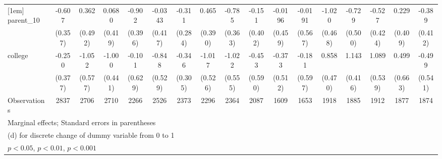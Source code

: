 {\begin{tabular}{l*{16}{c}}
[1em]
parent\_10           &      -0.607         &       0.362         &      0.0680         &      -0.902\sym{*}  &     -0.0343         &      -0.311         &       0.465         &      -0.785\sym{*}  &      -0.151         &     -0.0196         &     -0.0191         &      -1.020\sym{*}  &      -0.729         &      -0.527         &       0.229         &      -0.389         \\
                    &     (0.357)         &     (0.492)         &     (0.419)         &     (0.396)         &     (0.417)         &     (0.284)         &     (0.390)         &     (0.363)         &     (0.402)         &     (0.459)         &     (0.567)         &     (0.468)         &     (0.500)         &     (0.424)         &     (0.409)         &     (0.412)         \\
[1em]
college             &      -0.250         &      -1.052         &      -1.000\sym{*}  &      -0.101         &      -0.848         &      -0.346         &      -1.017         &      -1.022         &      -0.453         &      -0.373         &      -0.181         &       0.858         &       1.143\sym{**} &       1.089\sym{*}  &       0.499         &      -0.499         \\
                    &     (0.377)         &     (0.577)         &     (0.441)         &     (0.629)         &     (0.529)         &     (0.305)         &     (0.526)         &     (0.555)         &     (0.590)         &     (0.512)         &     (0.597)         &     (0.470)         &     (0.416)         &     (0.539)         &     (0.663)         &     (0.541)         \\
\hline
Observations        &        2837         &        2706         &        2710         &        2266         &        2526         &        2373         &        2296         &        2364         &        2087         &        1609         &        1653         &        1918         &        1885         &        1912         &        1877         &        1874         \\
\hline\hline
\multicolumn{17}{l}{\footnotesize Marginal effects; Standard errors in parentheses}\\
\multicolumn{17}{l}{\footnotesize  (d) for discrete change of dummy variable from 0 to 1}\\
\multicolumn{17}{l}{\footnotesize \sym{*} \(p<0.05\), \sym{**} \(p<0.01\), \sym{***} \(p<0.001\)}\\
\end{tabular}
}
